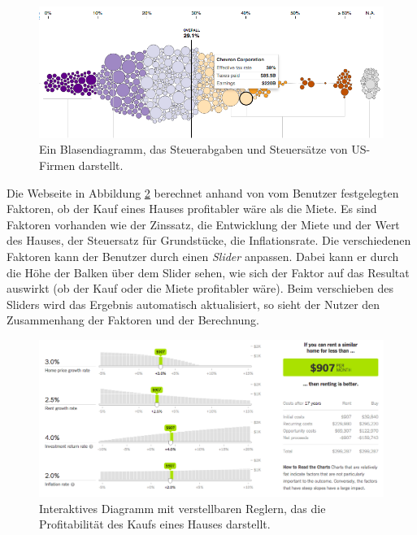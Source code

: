 \begin{figure}[!htbp]
	\centering
	\includegraphics[width=\linewidth]{images/nytimes-taxes-zugeschnitten}
	\caption[Blasendiagramm in der New York Times]{Ein Blasendiagramm, das Steuerabgaben und Steuersätze von US-Firmen darstellt. \cite{nytimes-taxes}}
	\label{fig:nytimes-taxes}
\end{figure}

Die Webseite in Abbildung \ref{fig:nytimes-realestate} berechnet anhand von vom Benutzer festgelegten Faktoren, ob der Kauf eines Hauses profitabler wäre als die Miete. Es sind Faktoren vorhanden wie der Zinssatz, die Entwicklung der Miete und der Wert des Hauses, der Steuersatz für Grundstücke, die Inflationsrate. Die verschiedenen Faktoren kann der Benutzer durch einen \textit{Slider} anpassen. Dabei kann er durch die Höhe der Balken über dem Slider sehen, wie sich der Faktor auf das Resultat auswirkt (ob der Kauf oder die Miete profitabler wäre). Beim verschieben des Sliders wird das Ergebnis automatisch aktualisiert, so sieht der Nutzer den Zusammenhang der Faktoren und der Berechnung.

\begin{figure}[!htbp]
	\centering
	\includegraphics[width=\linewidth]{images/nytimes-realestate-zugeschnitten}
	\caption[Interaktives Diagramm in der New York Times]{Interaktives Diagramm mit verstellbaren Reglern, das die Profitabilität des Kaufs eines Hauses darstellt. \cite{nytimes-realestate}}
	\label{fig:nytimes-realestate}
\end{figure}

